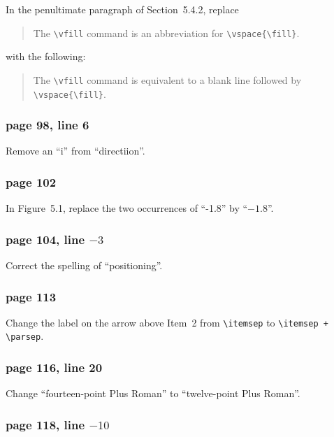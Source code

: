 In the penultimate paragraph of Section~5.4.2, replace 
\begin{quote}
The \verb|\vfill| command is an abbreviation for \verb|\vspace{\fill}|.
\end{quote}
with the following:
\begin{quote}
The \verb|\vfill| command is equivalent to a blank line followed by
\verb|\vspace{\fill}|.
\end{quote}

\subsubsection*{page 98, line 6}

Remove an ``i'' from ``directiion''. 

\subsubsection*{page 102}
In Figure~5.1, replace the two occurrences of ``-1.8'' by
``$-1.8$''.

\subsubsection*{page 104, line $-3$}
Correct the spelling of ``positioning''.


\subsubsection*{page 113}
Change the label on the arrow above Item~2 from \verb|\itemsep| to
\verb|\itemsep + \parsep|.


\subsubsection*{page 116, line 20}

Change ``fourteen-point Plus Roman'' to ``twelve-point Plus Roman''.

\subsubsection*{page 118, line $-10$}

